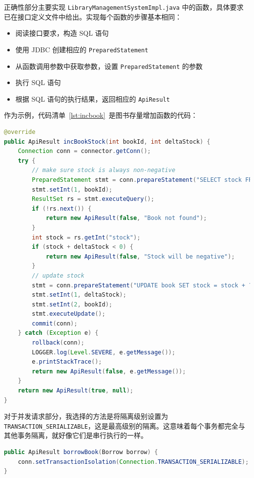 \documentclass[a4paper,oneside]{ctexbook}
\begin{document}
正确性部分主要实现 \verb|LibraryManagementSystemImpl.java| 中的函数，具体要求已在接口定义文件中给出。实现每个函数的步骤基本相同：

\begin{itemize}
    \item 阅读接口要求，构造 SQL 语句
    \item 使用 JDBC 创建相应的 \verb|PreparedStatement|
    \item 从函数调用参数中获取参数，设置 \verb|PreparedStatement| 的参数
    \item 执行 SQL 语句
    \item 根据 SQL 语句的执行结果，返回相应的 \verb|ApiResult|
\end{itemize}

作为示例，代码清单~\ref{lst:incbook}~是图书存量增加函数的代码：

\begin{lstlisting}[language=java, caption=增加图书存量函数,label=lst:incbook]
@override
public ApiResult incBookStock(int bookId, int deltaStock) {
    Connection conn = connector.getConn();
    try {
        // make sure stock is always non-negative
        PreparedStatement stmt = conn.prepareStatement("SELECT stock FROM book WHERE book_id = ?");
        stmt.setInt(1, bookId);
        ResultSet rs = stmt.executeQuery();
        if (!rs.next()) {
            return new ApiResult(false, "Book not found");
        }
        int stock = rs.getInt("stock");
        if (stock + deltaStock < 0) {
            return new ApiResult(false, "Stock will be negative");
        }
        // update stock
        stmt = conn.prepareStatement("UPDATE book SET stock = stock + ? WHERE book_id = ?");
        stmt.setInt(1, deltaStock);
        stmt.setInt(2, bookId);
        stmt.executeUpdate();
        commit(conn);
    } catch (Exception e) {
        rollback(conn);
        LOGGER.log(Level.SEVERE, e.getMessage());
        e.printStackTrace();
        return new ApiResult(false, e.getMessage());
    }
    return new ApiResult(true, null);
}
\end{lstlisting}

对于并发请求部分，我选择的方法是将隔离级别设置为 \verb|TRANSACTION_SERIALIZABLE|，这是最高级别的隔离。这意味着每个事务都完全与其他事务隔离，就好像它们是串行执行的一样。

\begin{lstlisting}[language=java, caption=并发请求处理]
public ApiResult borrowBook(Borrow borrow) {
    conn.setTransactionIsolation(Connection.TRANSACTION_SERIALIZABLE);
}
\end{lstlisting}
\end{document}
